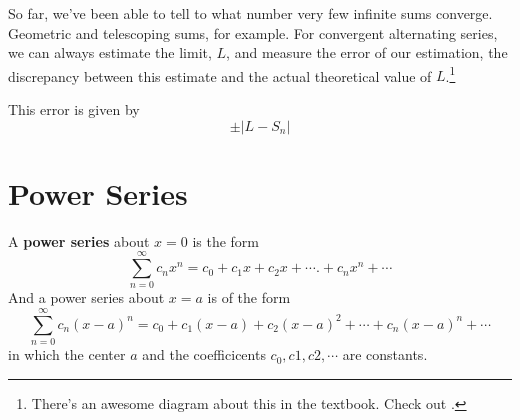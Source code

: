 So far, we've been able to tell to what number very few infinite sums converge.
Geometric and telescoping sums, for example. For convergent alternating series,
we can always estimate the limit, $L$, and measure the error of our estimation,
the discrepancy between this estimate and the actual theoretical value of
$L$.\footnote{There's an awesome diagram about this in the textbook. Check out
  \cite[p.~569 Fig.~10.13]{thomas}.}

This error is given by
\begin{equation}
  \pm | L - S_n |
\end{equation}

%
\section{Power Series}
A \textbf{power series} about $x=0$ is the form
\[ \sum_{n=0}^\infty c_n x^n = c_0 + c_1 x + c_2 x + \cdots. + c_n x^n + \cdots
  \]
  And a power series about $x=a$ is of the form
  \begin{equation}\label{eq:powerxa} \sum_{n=0}^\infty c_n (x-a)^n = c_0 + c_1 (x-a) + c_2 (x-a)^2 +
    \cdots + c_n (x-a)^n + \cdots \end{equation}
    in which the center $a$ and the coefficicents $c_0, c1, c2, \cdots$ are
    constants.

